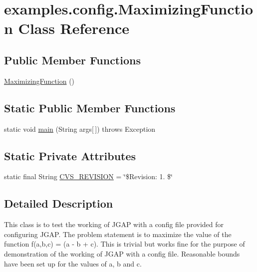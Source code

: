 \hypertarget{classexamples_1_1config_1_1_maximizing_function}{\section{examples.\-config.\-Maximizing\-Function Class Reference}
\label{classexamples_1_1config_1_1_maximizing_function}
}
\subsection*{Public Member Functions}
\begin{DoxyCompactItemize}
\item 
\hyperlink{classexamples_1_1config_1_1_maximizing_function_ad9e62f3a3a329c8daafc2b52a04fe775}{Maximizing\-Function} ()
\end{DoxyCompactItemize}
\subsection*{Static Public Member Functions}
\begin{DoxyCompactItemize}
\item 
static void \hyperlink{classexamples_1_1config_1_1_maximizing_function_a59c36e76a2065b2c5832b83cf4c4f705}{main} (String args\mbox{[}$\,$\mbox{]})  throws Exception
\end{DoxyCompactItemize}
\subsection*{Static Private Attributes}
\begin{DoxyCompactItemize}
\item 
static final String \hyperlink{classexamples_1_1config_1_1_maximizing_function_a38563017a5b93d5b3cdda6586910861b}{C\-V\-S\-\_\-\-R\-E\-V\-I\-S\-I\-O\-N} = \char`\"{}\$Revision\-: 1. \$\char`\"{}
\end{DoxyCompactItemize}


\subsection{Detailed Description}
This class is to test the working of J\-G\-A\-P with a config file provided for configuring J\-G\-A\-P. The problem statement is to maximize the value of the function f(a,b,c) = (a -\/ b + c). This is trivial but works fine for the purpose of demonstration of the working of J\-G\-A\-P with a config file. Reasonable bounds have been set up for the values of a, b and c.

